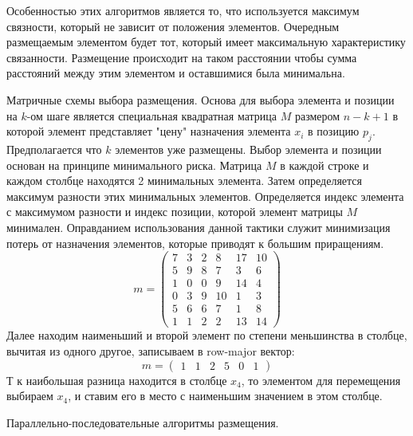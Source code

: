 \documentclass{article}
\begin{document}
	Особенностью этих алгоритмов является то, что используется максимум связности, который не зависит от положения элементов. Очередным размещаемым элементом будет тот, который имеет максимальную характеристику связанности. Размещение происходит на таком расстоянии чтобы сумма расстояний между этим элементом и оставшимися была минимальна.

	Матричные схемы выбора размещения.
	Основа для выбора элемента и позиции на $k$-ом шаге является специальная квадратная матрица $M$ размером $n - k + 1$ в которой элемент представляет "цену" назначения элемента $x_i$ в позицию $p_j$. Предполагается что $k$ элементов уже размещены. Выбор элемента и позиции основан на принципе минимального риска. Матрица $M$ в каждой строке и каждом столбце находятся 2 минимальных элемента. Затем определяется максимум разности этих минимальных элементов. Определяется индекс элемента с максимумом разности и индекс позиции, которой элемент матрицы $M$ минимален. Оправданием использования данной тактики служит минимизация потерь от назначения элементов, которые приводят к большим приращениям.
	$$
	m = 
	\begin{pmatrix}
		7 & 3 & 2 & 8 & 17 & 10\\
		5 & 9 & 8 & 7 & 3 & 6 \\
		1 & 0 & 0 & 9 & 14 & 4\\
		0 & 3 & 9 & 10 & 1 & 3\\
		5 & 6 & 6 & 7 & 1 & 8\\
		1 & 1 & 2 & 2 & 13 & 14
	\end{pmatrix}
	$$
	Далее находим наименьший и второй элемент по степени меньшинства в столбце, вычитая из одного другое, записываем в row-major вектор:
	$$
	m = 
	\begin{pmatrix}
		1 & 1 & 2 & 5 & 0 & 1
	\end{pmatrix}
	$$
	Т к наибольшая разница находится в столбце $x_4$, то элементом для перемещения выбираем $x_4$, и ставим его в место с наименьшим значением в этом столбце.
	
	Параллельно-последовательные алгоритмы размещения.
\end{document}
